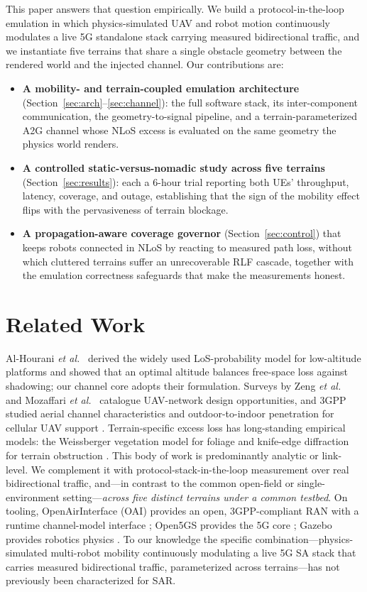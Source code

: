 \documentclass[10pt, conference]{IEEEtran}
\begin{document}
This paper answers that question empirically. We build a protocol-in-the-loop
emulation in which physics-simulated UAV and robot motion continuously modulates a
live 5G standalone stack carrying measured bidirectional traffic, and we
instantiate five terrains that share a single obstacle geometry between the
rendered world and the injected channel. Our contributions are:
\begin{itemize}
  \item \textbf{A mobility- and terrain-coupled emulation architecture}
  (Section~\ref{sec:arch}--\ref{sec:channel}): the full software stack, its
  inter-component communication, the geometry-to-signal pipeline, and a
  terrain-parameterized A2G channel whose NLoS excess is evaluated on the same
  geometry the physics world renders.
  \item \textbf{A controlled static-versus-nomadic study across five terrains}
  (Section~\ref{sec:results}): each a 6-hour trial reporting both UEs' throughput,
  latency, coverage, and outage, establishing that the sign of the mobility effect
  flips with the pervasiveness of terrain blockage.
  \item \textbf{A propagation-aware coverage governor}
  (Section~\ref{sec:control}) that keeps robots connected in NLoS by reacting to
  measured path loss, without which cluttered terrains suffer an unrecoverable RLF
  cascade, together with the emulation correctness safeguards that make the
  measurements honest.
\end{itemize}

\section{Related Work}
Al-Hourani \emph{et al.}~\cite{alhourani2014optimal} derived the widely used
LoS-probability model for low-altitude platforms and showed that an optimal
altitude balances free-space loss against shadowing; our channel core adopts their
formulation. Surveys by Zeng \emph{et al.}~\cite{zeng2016wireless, zeng2019accessing}
and Mozaffari \emph{et al.}~\cite{mozaffari2019tutorial} catalogue UAV-network
design opportunities, and 3GPP studied aerial channel characteristics and
outdoor-to-indoor penetration for cellular UAV support
\cite{3gpp36777, 3gpp38901}. Terrain-specific excess loss has long-standing
empirical models: the Weissberger vegetation model for foliage
\cite{weissberger1982} and knife-edge diffraction for terrain obstruction
\cite{ituP526}. This body of work is predominantly analytic or link-level. We
complement it with protocol-stack-in-the-loop measurement over real bidirectional
traffic, and---in contrast to the common open-field or single-environment
setting---\emph{across five distinct terrains under a common testbed}. On tooling,
OpenAirInterface (OAI) provides an open, 3GPP-compliant RAN with a runtime
channel-model interface \cite{nikaein2014oai}; Open5GS provides the 5G core
\cite{open5gs}; Gazebo provides robotics physics \cite{koenig2004gazebo}. To our
knowledge the specific combination---physics-simulated multi-robot mobility
continuously modulating a live 5G SA stack that carries measured bidirectional
traffic, parameterized across terrains---has not previously been characterized for
SAR.
\end{document}
